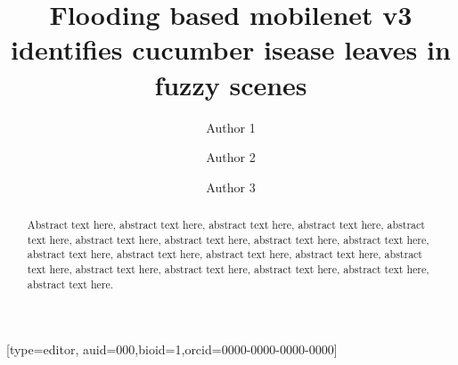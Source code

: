 \documentclass[a4paper,fleqn]{cas-sc}
\begin{document}
\let\WriteBookmarks\relax
\def\floatpagepagefraction{1}
\def\textpagefraction{.001}

\title [mode = title]{Flooding based mobilenet v3 identifies cucumber isease leaves in fuzzy scenes  }


\author[1]{Author 1}[type=editor,
                        auid=000,bioid=1,orcid=0000-0000-0000-0000]

\author[2]{Author 2} 

\author[3]{Author 3}

\address[1]{Author 1 affiliation}
\address[2]{Author 2 affiliation}
\address[3]{Author 3 affiliation} 

\begin{abstract}
Abstract text here, abstract text here,  abstract text here,  abstract text here,  abstract text here,  abstract text here,  abstract text here,  abstract text here,  abstract text here,  abstract text here,  abstract text here,  abstract text here,  abstract text here,  abstract text here,  abstract text here,  abstract text here,  abstract text here,  abstract text here,  abstract text here.
\end{abstract}
 

 
 





\end{document}
